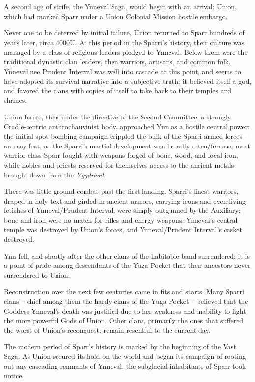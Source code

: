 A second age of strife, the Ynneval Saga, would begin with an arrival: Union, which had marked
Sparr under a Union Colonial Mission hostile embargo.

Never one to be deterred by initial failure, Union returned to Sparr hundreds of years later, circa
4000U. At this period in the Sparri’s history, their culture was managed by a class of religious
leaders pledged to Ynneval. Below them were the traditional dynastic clan leaders, then warriors,
artisans, and common folk. Ynneval nee Prudent Interval was well into cascade at this point, and
seems to have adopted its survival narrative into a subjective truth: it believed itself a god, and
favored the clans with copies of itself to take back to their temples and shrines.

Union forces, then under the directive of the Second Committee, a strongly Cradle-centric
anthrochauvinist body, approached Ynn as a hostile central power: the initial spot-bombing
campaign crippled the bulk of the Sparri armed forces -- an easy feat, as the Sparri’s martial
development was broadly osteo/ferrous; most warrior-class Sparr fought with weapons forged of
bone, wood, and local iron, while nobles and priests reserved for themselves access to the
ancient metals brought down from the \textit{Yggdrasil}.

There was little ground combat past the first landing. Sparri’s finest warriors, draped in holy text
and girded in ancient armors, carrying icons and even living fetishes of Ynneval/Prudent Interval,
were simply outgunned by the Auxiliary; bone and iron were no match for rifles and energy
weapons. Ynneval’s central temple was destroyed by Union’s forces, and Ynneval/Prudent
Interval’s casket destroyed.

Ynn fell, and shortly after the other clans of the habitable band surrendered; it is a point of pride
among descendants of the Yuga Pocket that their ancestors never surrendered to Union.

Reconstruction over the next few centuries came in fits and starts. Many Sparri clans -- chief
among them the hardy clans of the Yuga Pocket -- believed that the Goddess Ynneval’s death
was justified due to her weakness and inability to fight the more powerful Gods of Union. Other
clans, primarily the ones that suffered the worst of Union’s reconquest, remain resentful to the
current day.

The modern period of Sparr’s history is marked by the beginning of the Vast Saga. As Union
secured its hold on the world and began its campaign of rooting out any cascading remnants of
Ynneval, the subglacial inhabitants of Sparr took notice.


